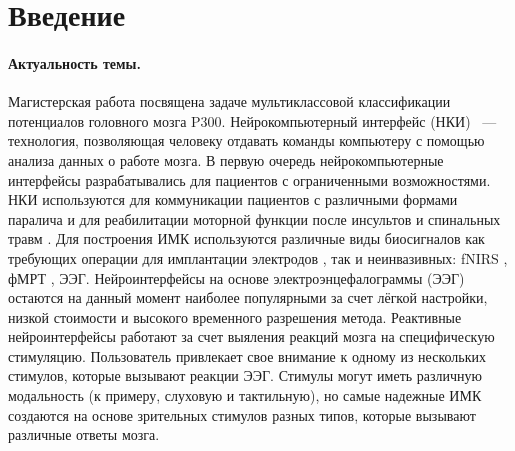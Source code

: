 \documentclass[12pt]{article}
\begin{document}
	\newpage
	
	\section*{Введение}
	
	\paragraph{Актуальность темы.}
	Магистерская работа посвящена задаче мультиклассовой классификации потенциалов головного мозга P300. 
	Нейрокомпьютерный интерфейс (НКИ) ~--- технология, позволяющая человеку отдавать команды компьютеру с помощью анализа данных о работе мозга. %
	В первую очередь нейрокомпьютерные интерфейсы разрабатывались для пациентов с ограниченными возможностями. НКИ используются для коммуникации пациентов с различными формами паралича и для реабилитации моторной функции после инсультов и спинальных травм \cite{chaudhary2020neuropsychological}. Для построения ИМК используются различные виды биосигналов как требующих операции для имплантации электродов \cite{collinger2013high}, так и неинвазивных:  fNIRS \cite{nazeer2020enhancing}, фМРТ \cite{yoo2004brain}, ЭЭГ. Нейроинтерфейсы на основе электроэнцефалограммы (ЭЭГ) остаются на данный момент наиболее популярными за счет лёгкой настройки, низкой стоимости и высокого временного разрешения метода. 
	Реактивные нейроинтерфейсы работают за счет выяления реакций мозга на специфическую стимуляцию. Пользователь привлекает свое внимание к одному из нескольких стимулов, которые вызывают реакции ЭЭГ. Стимулы могут иметь различную модальность (к примеру, слуховую и тактильную), но самые надежные ИМК создаются на основе зрительных стимулов разных типов, которые вызывают различные ответы мозга.
\end{document}
